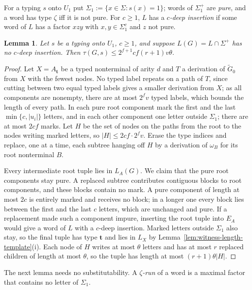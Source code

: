 \documentclass[11pt]{article}
\numberwithin{equation}{section}
\theoremstyle{plain}
\newtheorem{lemma}[theorem]{Lemma}
\theoremstyle{definition}
\theoremstyle{remark}
\begin{document}
For a typing $s$ onto $U_1$ put $\Sigma_1:=\{x\in\Sigma:s(x)=1\}$; words of
$\Sigma_1^+$ are \emph{pure}, and a word has type $\zeta$ iff it is not pure.  For
$c\ge1$, $L$ has a \emph{$c$-deep insertion} if some word of $L$ has a factor
$xzy$ with $x,y\in\Sigma_1^c$ and $z$ not pure.

\begin{lemma}\label{lem:app-u1-shallow}
Let $s$ be a typing onto $U_1$, $c\ge1$, and suppose $L(G)=L\cap\Sigma^+$ has no
$c$-deep insertion.  Then $\tau(G,s)\le2^{f+1}cf(r+1)v\theta$.
\end{lemma}

\begin{proof}
Let $X=A_{\mathbf t}$ be a typed nonterminal of arity $d$ and $T$ a derivation of
$\widetilde G_0$ from $X$ with the fewest nodes.  No typed label repeats on a path
of $T$, since cutting between two equal typed labels gives a smaller derivation
from $X$; as all components are nonempty, there are at most $2^fv$ typed labels,
which bounds the length of every path.  In each pure root component mark the
first and the last $\min\{c,|u_i|\}$ letters, and in each other component one
letter outside $\Sigma_1$; there are at most $2cf$ marks.  Let $H$ be the set of
nodes on the paths from the root to the nodes writing marked letters, so
$|H|\le2cf\cdot2^fv$.  Erase the type indices and replace, one at a time, each
subtree hanging off $H$ by a derivation of $\omega_B$ for its root nonterminal $B$.

Every intermediate root tuple lies in $L_A(G)$.  We claim that the pure root
components stay pure.  A replaced subtree contributes contiguous blocks to root
components, and these blocks contain no mark.  A pure component of length at
most $2c$ is entirely marked and receives no block; in a longer one every block
lies between the first and the last $c$ letters, which are unchanged and pure.
If a replacement made such a component impure, inserting the root tuple into
$E_A$ would give a word of $L$ with a $c$-deep insertion.  Marked letters outside
$\Sigma_1$ also stay, so the final tuple has type $\mathbf t$ and lies in $L_X$ by
Lemma~\ref{lem:witness-length-template}(i).  Each node of $H$ writes at most
$\theta$ letters and has at most $r$ replaced children of length at most
$\theta$, so the tuple has length at most $(r+1)\theta|H|$.
\end{proof}

The next lemma needs no substitutability.  A \emph{$\zeta$-run} of a word is a
maximal factor that contains no letter of $\Sigma_1$.
\end{document}
